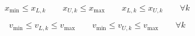 \begin{equation}
  x_\text{min} \leq x_{L, k}
  \quad \quad
  x_{U, k} \leq x_\text{max}
  \quad \quad
  x_{L, k} \leq x_{U, k}
  \quad \quad
  \forall k
\end{equation}

\begin{equation}
  v_\text{min} \leq v_{L,k} \leq v_\text{max}
  \quad \quad
  v_\text{min} \leq v_{U,k} \leq v_\text{max}
  \quad \quad \forall k
\end{equation}

